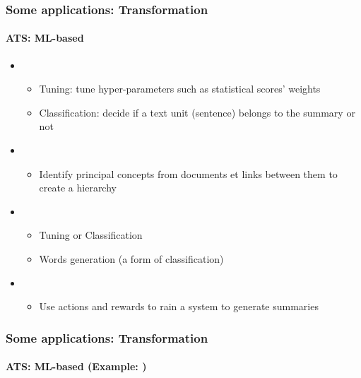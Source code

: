\documentclass[xcolor=table]{beamer}
\begin{document}
\begin{frame}
	\frametitle{Some applications: Transformation}
	\framesubtitle{ATS: ML-based}
	
	\begin{itemize}
		\item {}
		\begin{itemize}
			\item Tuning: tune hyper-parameters such as statistical scores' weights
			\item Classification: decide if a text unit (sentence) belongs to the summary or not
		\end{itemize}
		\item {}
		\begin{itemize}
			\item Identify principal concepts from documents et links between them to create a hierarchy
		\end{itemize}
		\item {}
		\begin{itemize}
			\item Tuning or Classification
			\item Words generation (a form of classification)
		\end{itemize}
		\item {}
		\begin{itemize}
			\item Use actions and rewards to rain a system to generate summaries
		\end{itemize}
	\end{itemize}
	
\end{frame}


\begin{frame}
	\frametitle{Some applications: Transformation}
	\framesubtitle{ATS: ML-based (Example: \cite{2020-aries})}
	
	\begin{center}
	\end{center}
	
\end{frame}
\end{document}
